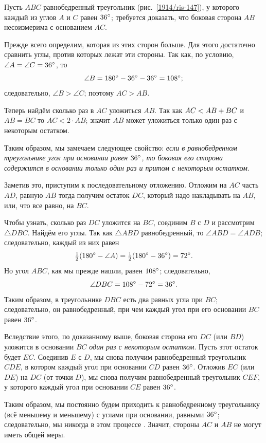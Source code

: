 \documentclass[oneside]{book}
\begin{document}
Пусть $ABC$ равнобедренный треугольник (рис.~\ref{1914/ris-147}), у которого каждый из углов $A$ и $C$ равен $36\degree$; 
требуется доказать, что боковая сторона $AB$ несоизмерима с основанием $AC$.

Прежде всего определим, которая из этих сторон больше.
Для этого достаточно сравнить углы, против которых лежат эти стороны.
Так как, по условию, $\angle A=\angle C=36\degree$, то 
\[\angle B=180\degree-36\degree-36\degree=108\degree;\]
следовательно, $\angle B>\angle C$;
поэтому $AC>AB$.

Теперь найдём сколько раз в $AC$ уложиться $AB$.
Так как $AC\z<AB+BC$ и $AB=BC$ то $AC<2\cdot AB$;
значит $AB$ может уложиться только один раз с некоторым остатком.

Таким образом, мы замечаем следующее свойство:
\emph{если в равнобедренном треугольнике угол при основании равен $36\degree$, то боковая его сторона содержится в основании только один раз и притом с некоторым остатком.}

Заметив это, приступим к последовательному отложению.
Отложим на $AC$ часть $AD$, равную $AB$ тогда получим остаток $DC$, который надо накладывать на $AB$, или, что все равно, на $BC$.

Чтобы узнать, сколько раз $DC$ уложится на $BC$, соединим $B$ с $D$ и рассмотрим $\triangle DBC$.
Найдём его углы.
Так как $\triangle ABD$ равнобедренный, то $\angle ABD = \angle ADB$;
следовательно, каждый из них равен 
\[\tfrac12(180\degree -\angle A)=\tfrac12(180\degree -36\degree)=72\degree.\]
Но угол $ABC$, как мы прежде нашли, равен $108\degree$; следовательно, 
\[\angle DBC=108\degree-72\degree=36\degree.\]
Таким образом, в треугольнике $DBC$ есть два равных угла при $BC$; следовательно, он равнобедренный, при чем каждый угол при его основании $BC$ равен $36\degree$.

Вследствие этого, по доказанному выше, боковая сторона его $DC$
(или $BD$) уложится в основании $BC$ \emph{один раз с некоторым остатком}.
Пусть этот остаток будет $EC$.
Соединив $E$ с $D$, мы снова получим равнобедренный треугольник $CDE$, в котором каждый угол при основании $CD$ равен $36\degree$.
Отложив $EC$ (или $DE$) на $DC$ (от точки $D$), мы снова получим равнобедренный треугольник $CEF$, у которого каждый угол при основании $CE$ равен $36\degree$.

Таким образом, мы постоянно будем приходить к равнобедренному треугольнику (всё меньшему и меньшему) с углами при основании, равными $36\degree$;
следовательно, мы никогда в этом процессе .
Значит, стороны $AC$ и $AB$ не могут иметь общей меры.
\end{document}
